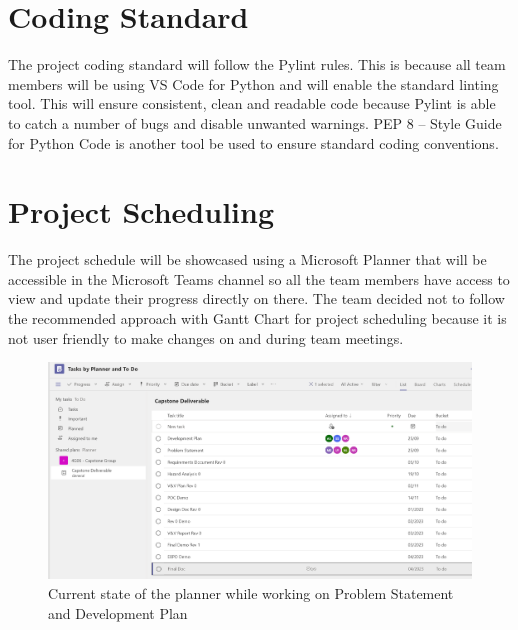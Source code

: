 \documentclass{article}
\begin{document}
\section{Coding Standard}
The project coding standard will follow the Pylint rules. This is because all team members will be using VS Code for Python and will enable the standard linting tool. This will ensure consistent, clean and readable code because Pylint is able to catch a number of bugs and disable unwanted warnings. %
PEP 8 – Style Guide for Python Code is another tool be used to ensure standard coding conventions. %

\section{Project Scheduling} %
The project schedule will be showcased using a Microsoft Planner that will be accessible in the Microsoft Teams channel so all the team members have access to view and update their progress directly on there. The team decided not to follow the recommended approach with Gantt Chart for project scheduling because it is not user friendly to make changes on and during team meetings.
\begin{figure}[h]
\caption{Current state of the planner while working on Problem Statement and Development Plan}
\centering
\includegraphics[width=\textwidth]{./SProject schedule.png}
\end{figure}
\end{document}
